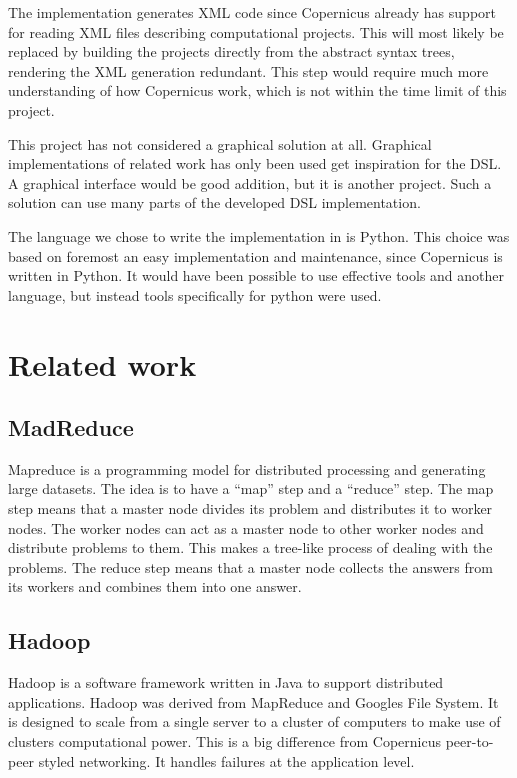 The implementation generates XML code since Copernicus already has
support for reading XML files describing computational projects. This
will most likely be replaced by building the projects directly from
the abstract syntax trees, rendering the XML generation
redundant. This step would require much more understanding of how
Copernicus work, which is not within the time limit of this project.

This project has not considered a graphical solution at all. Graphical
implementations of related work has only been used get inspiration for
the DSL. A graphical interface would be good addition, but it is
another project. Such a solution can use many parts of the developed
DSL implementation.

The language we chose to write the implementation in is Python. This
choice was based on foremost an easy implementation and maintenance,
since Copernicus is written in Python. It would have been possible to
use effective tools and another language, but instead tools
specifically for python were used.


\section{Related work}

\subsection{MadReduce}
Mapreduce\cite{dean:2008} is a programming model for distributed
processing and generating large datasets. The idea is to have a
``map'' step and a ``reduce'' step. The map step means that a master
node divides its problem and distributes it to worker nodes. The
worker nodes can act as a master node to other worker nodes and
distribute problems to them. This makes a tree-like process of dealing
with the problems. The reduce step means that a master node collects
the answers from its workers and combines them into one answer.

\subsection{Hadoop}
Hadoop\cite{hadoop:online} is a software framework written in Java to
support distributed applications. Hadoop was derived from MapReduce
and Googles File System. It is designed to scale from a single server
to a cluster of computers to make use of clusters computational
power. This is a big difference from Copernicus peer-to-peer styled
networking. It handles failures at the application level.

